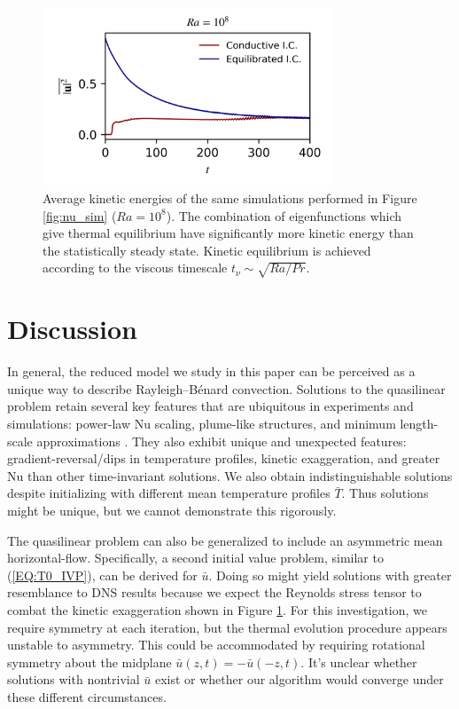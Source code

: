 \documentclass[reprint,amsmath,amssymb,aps]{revtex4-1}
\newcommand\Nu{\mathrm{Nu}}
\begin{document}
\begin{figure}
    \begin{minipage}{3.4in}
        \centering
        \includegraphics[width=3.4in]{sim_eq_ke.png}
        \caption{Average kinetic energies of the same simulations performed in Figure \ref{fig:nu_sim} ($Ra = 10^8$). 
        The combination of eigenfunctions which give thermal equilibrium have significantly more kinetic energy than the statistically steady state. 
        Kinetic equilibrium is achieved according to the viscous timescale $t_{\nu} \sim \sqrt{Ra / Pr}$.}
        \label{fig:ke_sim}
    \end{minipage}
\end{figure}

\section{Discussion}\label{sec:Discussion}
In general, the reduced model we study in this paper can be perceived as a unique way to describe Rayleigh–Bénard convection. 
Solutions to the quasilinear problem retain several key features that are ubiquitous in experiments and simulations: power-law $\Nu$ scaling, plume-like structures, and minimum length-scale approximations \cite{Malkus}. 
They also exhibit unique and unexpected features: gradient-reversal/dips in temperature profiles, kinetic exaggeration, and greater $\Nu$ than other time-invariant solutions. 
We also obtain indistinguishable solutions despite initializing with different mean temperature profiles $\bar{T}$. 
Thus solutions might be unique, but we cannot demonstrate this rigorously.

The quasilinear problem can also be generalized to include an asymmetric mean horizontal-flow. 
Specifically, a second initial value problem, similar to (\ref{EQ:T0_IVP}), can be derived for $\bar{u}$. 
Doing so might yield solutions with greater resemblance to DNS results because we expect the Reynolds stress tensor to combat the kinetic exaggeration shown in Figure \ref{fig:ke_sim}. 
For this investigation, we require symmetry at each iteration, but the thermal evolution procedure appears unstable to asymmetry. 
This could be accommodated by requiring rotational symmetry about the midplane $\bar{u}(z, t) = -\bar{u}(-z, t)$. 
It's unclear whether solutions with nontrivial $\bar{u}$ exist or whether our algorithm would converge under these different circumstances.
\end{document}
